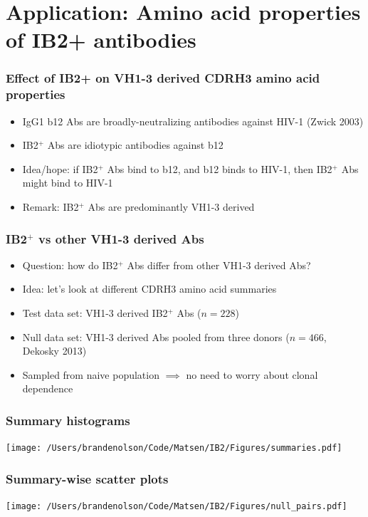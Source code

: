 \documentclass[mathserif,compress]{beamer}
\renewcommand\;{\,}
\begin{document}
\section{Application: Amino acid properties of IB2+ antibodies}

\begin{frame}\frametitle{Effect of IB2+ on VH1-3 derived CDRH3 amino acid properties}
\begin{itemize}
\item
IgG1 b12 Abs are broadly-neutralizing antibodies against HIV-1 (Zwick 2003)
 \bigskip
 \item
IB2$^+$ Abs are idiotypic antibodies against b12
\bigskip
\item
Idea/hope: if IB2$^+$ Abs bind to b12, and b12 binds to HIV-1, then IB2$^+$ Abs might bind to HIV-1 
\bigskip
\item
Remark: IB2$^+$ Abs are predominantly VH1-3 derived
\end{itemize}
\end{frame}

\begin{frame}\frametitle{IB2$^+$ vs other VH1-3 derived Abs}
\begin{itemize}
\item
Question: how do IB2$^+$ Abs differ from other VH1-3 derived Abs?
\bigskip
\item
Idea: let's look at different CDRH3 amino acid summaries
\bigskip
\item
Test data set: VH1-3 derived IB2$^+$ Abs ($n = 228$)
\bigskip
\item
Null data set: VH1-3 derived Abs pooled from three donors ($n = 466$, Dekosky 2013)
\bigskip
\item
Sampled from naive population $\implies $ no need to worry about clonal dependence 
\end{itemize}
\end{frame}

\begin{frame}\frametitle{Summary histograms}
\begin{center}
\texttt{[image: /Users/brandenolson/Code/Matsen/IB2/Figures/summaries.pdf]}
\end{center}
\end{frame}

\begin{frame}\frametitle{Summary-wise scatter plots}
\begin{center}
\texttt{[image: /Users/brandenolson/Code/Matsen/IB2/Figures/null\_pairs.pdf]}
\end{center}
\end{frame}
\end{document}
